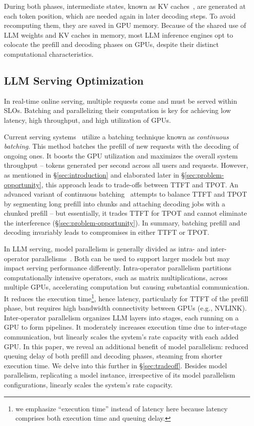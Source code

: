 During both phases, intermediate states, known as KV caches~\cite{vllm}, are generated at each token position, which are needed again in later decoding steps. To avoid recomputing them, they are saved in GPU memory. 
Because of the shared use of LLM weights and KV caches in memory, most LLM inference engines opt to colocate the prefill and decoding phases on GPUs, despite their distinct computational characteristics.

\subsection{LLM Serving Optimization}
\label{sec:llm-serving}
In real-time online serving, multiple requests come and must be served within SLOs. Batching and parallelizing their computation is key for achieving low latency, high throughput, and high utilization of GPUs. 

Current serving systems~\cite{yu2022orca,vllm, agrawal2023sarathi} utilize a batching technique known as \emph{continuous batching}. This method batches the prefill of new requests with the decoding of ongoing ones. It boosts the GPU utilization and maximizes the overall system throughput -- tokens generated per second across all users and requests.
However, as mentioned in \S\ref{sec:introduction} and elaborated later in \S\ref{sec:problem-opportunity}, this approach leads to trade-offs between TTFT and TPOT.
An advanced variant of continuous batching~\cite{agrawal2023sarathi} attempts to balance TTFT and TPOT by segmenting long prefill into chunks and attaching decoding jobs with a chunked prefill  --  but essentially, it trades TTFT for TPOT and cannot eliminate the interference (\S\ref{sec:problem-opportunity}).
In summary, batching prefill and decoding invariably leads to compromises in either TTFT or TPOT.

 In LLM serving, model parallelism is generally divided as intra- and inter-operator parallelisms~\cite{li2023alpaserve,alpa,shoeybi2020megatronlm}. Both can be used to support larger models but may impact serving performance differently. 
Intra-operator parallelism partitions computationally intensive operators, such as matrix multiplications, across multiple GPUs, accelerating computation but causing substantial communication. 
It reduces the execution time\footnote{we emphasize ``execution time'' instead of latency here because latency comprises both execution time and queuing delay.}, hence latency, particularly for TTFT of the prefill phase, but requires high bandwidth connectivity between GPUs (e.g., NVLINK).
Inter-operator parallelism organizes LLM layers into stages, each running on a GPU to form pipelines. It moderately increases execution time due to inter-stage communication, but linearly scales the system's rate capacity with each added GPU.
In this paper, we reveal an additional benefit of model parallelism: reduced queuing delay of both prefill and decoding phases, steaming from shorter execution time. We delve into this further in \S\ref{sec:tradeoff}.
Besides model parallelism, replicating a model instance, irrespective of its model parallelism configurations, linearly scales the system's rate capacity.

